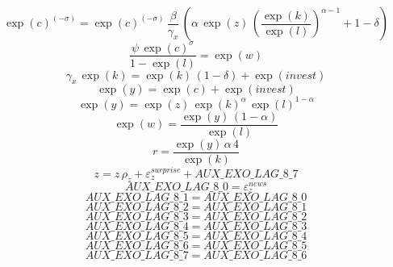 \begin{dmath}
\exp\left({c}\right)^{\left(-{\sigma}\right)}=\exp\left({c}\right)^{\left(-{\sigma}\right)}\, \frac{{\beta}}{{\gamma_x}}\, \left({\alpha}\, \exp\left({z}\right)\, \left(\frac{\exp\left({k}\right)}{\exp\left({l}\right)}\right)^{{\alpha}-1}+1-{\delta}\right)
\end{dmath}
\begin{dmath}
\frac{{\psi}\, \exp\left({c}\right)^{{\sigma}}}{1-\exp\left({l}\right)}=\exp\left({w}\right)
\end{dmath}
\begin{dmath}
{\gamma_x}\, \exp\left({k}\right)=\exp\left({k}\right)\, \left(1-{\delta}\right)+\exp\left({invest}\right)
\end{dmath}
\begin{dmath}
\exp\left({y}\right)=\exp\left({c}\right)+\exp\left({invest}\right)
\end{dmath}
\begin{dmath}
\exp\left({y}\right)=\exp\left({z}\right)\, \exp\left({k}\right)^{{\alpha}}\, \exp\left({l}\right)^{1-{\alpha}}
\end{dmath}
\begin{dmath}
\exp\left({w}\right)=\frac{\exp\left({y}\right)\, \left(1-{\alpha}\right)}{\exp\left({l}\right)}
\end{dmath}
\begin{dmath}
{r}=\frac{\exp\left({y}\right)\, {\alpha}\, 4}{\exp\left({k}\right)}
\end{dmath}
\begin{dmath}
{z}={z}\, {\rho_z}+{{\varepsilon_z^{surprise}}}+{AUX\_EXO\_LAG\_8\_7}
\end{dmath}
\begin{dmath}
{AUX\_EXO\_LAG\_8\_0}={{\varepsilon_z^{news}}}
\end{dmath}
\begin{dmath}
{AUX\_EXO\_LAG\_8\_1}={AUX\_EXO\_LAG\_8\_0}
\end{dmath}
\begin{dmath}
{AUX\_EXO\_LAG\_8\_2}={AUX\_EXO\_LAG\_8\_1}
\end{dmath}
\begin{dmath}
{AUX\_EXO\_LAG\_8\_3}={AUX\_EXO\_LAG\_8\_2}
\end{dmath}
\begin{dmath}
{AUX\_EXO\_LAG\_8\_4}={AUX\_EXO\_LAG\_8\_3}
\end{dmath}
\begin{dmath}
{AUX\_EXO\_LAG\_8\_5}={AUX\_EXO\_LAG\_8\_4}
\end{dmath}
\begin{dmath}
{AUX\_EXO\_LAG\_8\_6}={AUX\_EXO\_LAG\_8\_5}
\end{dmath}
\begin{dmath}
{AUX\_EXO\_LAG\_8\_7}={AUX\_EXO\_LAG\_8\_6}
\end{dmath}
